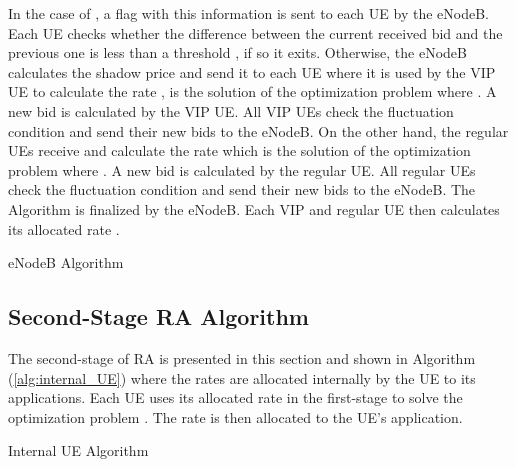 \documentclass[journal]{IEEEtran} 				\IEEEoverridecommandlockouts 						\usepackage{amsmath,amssymb}
\begin{document}
In the case of , a flag with this information is sent to each UE by the eNodeB. Each UE checks whether the difference between the current received bid and the previous one is less than a threshold , if so it exits. Otherwise, the eNodeB calculates the shadow price  and send it to each UE where it is used by the VIP UE to calculate the rate ,  is the solution of the optimization problem  where . A new bid  is calculated by the VIP UE. All VIP UEs check the fluctuation condition and send their new bids to the eNodeB. On the other hand, the regular UEs receive  and calculate the rate  which is the solution of the optimization problem  where . A new bid  is calculated by the regular UE. All regular UEs check the fluctuation condition and send their new bids to the eNodeB. The Algorithm is finalized by the eNodeB. Each VIP and regular UE then calculates its allocated rate .
\begin{algorithm}\caption{eNodeB Algorithm} \label{alg:eNodeB_first-stage}
\begin{algorithmic}
\LOOP
\WHILE {} 
\IF {, } 
		    \ELSE
        \ENDIF
        \ENDWHILE
	\WHILE {} 		
    \IF {} 
		    \ELSE
        \ENDIF
        \ENDWHILE
\ENDLOOP
\end{algorithmic}
\end{algorithm}
\subsection{Second-Stage RA Algorithm}\label{sec:app_alloc_alg}
The second-stage of RA is presented in this section and shown in Algorithm (\ref{alg:internal_UE}) where the rates  are allocated internally by the UE to its applications. Each UE uses its allocated rate  in the first-stage to solve the optimization problem . The rate  is then allocated to the UE's  application.
\begin{algorithm}\caption{Internal UE Algorithm}\label{alg:internal_UE}
\begin{algorithmic}
\LOOP
{}
\\
\COMMENT {}
\ENDLOOP
\end{algorithmic}
\end{algorithm}
\end{document}
